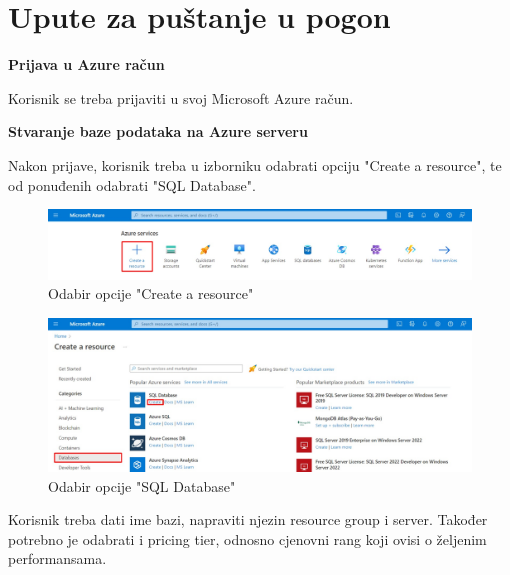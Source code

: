 			\eject
		
		\section{Upute za puštanje u pogon}

		
			\textbf{Prijava u Azure račun}
			
			\noindent Korisnik se treba prijaviti u svoj Microsoft Azure račun.
			
			\vspace{10mm}
			
			\noindent\textbf{Stvaranje baze podataka na Azure serveru}
	
			\noindent Nakon prijave, korisnik treba u izborniku odabrati opciju "Create a resource", te od ponuđenih odabrati "SQL Database".
	
			\vspace{10mm}
		
			\begin{figure}[H]
				 \includegraphics[width=\linewidth]{./slike/baza0.jpg}
				  \centering
				  \caption{Odabir opcije "Create a resource"}
			  \end{figure}
	
			\vspace{20mm}
			
		
			\begin{figure}[H]
				 \includegraphics[width=\linewidth]{./slike/baza1.jpg}
				  \centering
				  \caption{Odabir opcije "SQL Database"}
			  \end{figure}
			  
		
		\vspace{25mm}
	
			\noindent Korisnik treba dati ime bazi, napraviti njezin resource group i server. Također potrebno je odabrati i pricing tier, odnosno cjenovni rang koji ovisi o željenim performansama.
		
